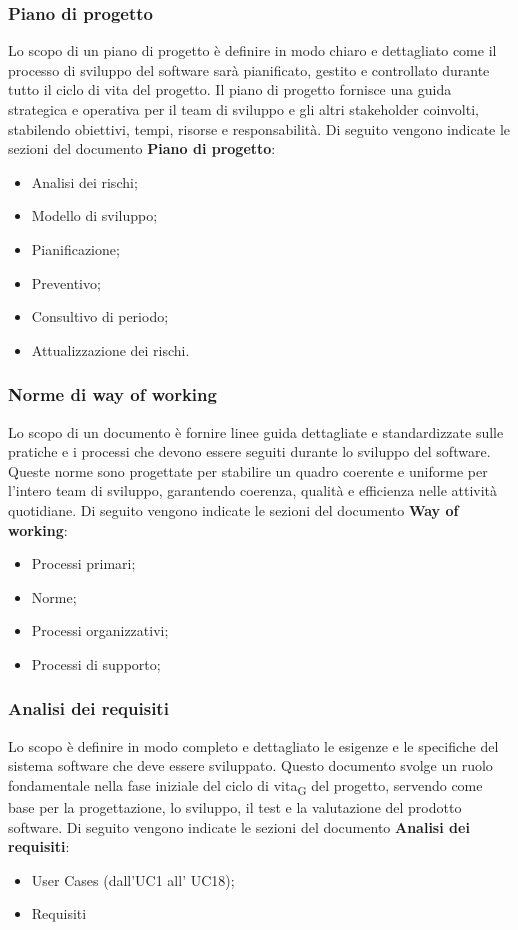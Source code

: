 \documentclass{article}
\begin{document}
\subsubsection*{\textbf{Piano di progetto}}
Lo scopo di un piano di progetto è definire in modo chiaro e dettagliato come il processo di sviluppo del software sarà pianificato, gestito e controllato durante tutto il ciclo di vita del progetto. Il piano di progetto fornisce una guida strategica e operativa per il team di sviluppo e gli altri stakeholder coinvolti, stabilendo obiettivi, tempi, risorse e responsabilità. Di seguito vengono indicate le sezioni del documento \textbf{Piano di progetto}:\begin{itemize}
    \item Analisi dei rischi;
    \item Modello di sviluppo;
    \item Pianificazione;
    \item Preventivo;
    \item Consultivo di periodo;
    \item Attualizzazione dei rischi.
\end{itemize}

\subsubsection*{Norme di way of working}
Lo scopo di un documento  è fornire linee guida dettagliate e standardizzate sulle pratiche e i processi che devono essere seguiti durante lo sviluppo del software. Queste norme sono progettate per stabilire un quadro coerente e uniforme per l'intero team di sviluppo, garantendo coerenza, qualità e efficienza nelle attività quotidiane. Di seguito vengono indicate le sezioni del documento \textbf{Way of working}:\begin{itemize}
    \item Processi primari;
    \item Norme;
    \item Processi organizzativi;
    \item Processi di supporto;
\end{itemize}

\subsubsection*{Analisi dei requisiti}
Lo scopo è definire in modo completo e dettagliato le esigenze e le specifiche del sistema software che deve essere sviluppato. Questo documento svolge un ruolo fondamentale nella fase iniziale del ciclo di vita\textsubscript{G} del progetto, servendo come base per la progettazione, lo sviluppo, il test e la valutazione del prodotto software.
Di seguito vengono indicate le sezioni del documento \textbf{Analisi dei requisiti}:\begin{itemize}
    \item User Cases (dall'UC1 all' UC18);
    \item Requisiti
\end{itemize}
\end{document}
